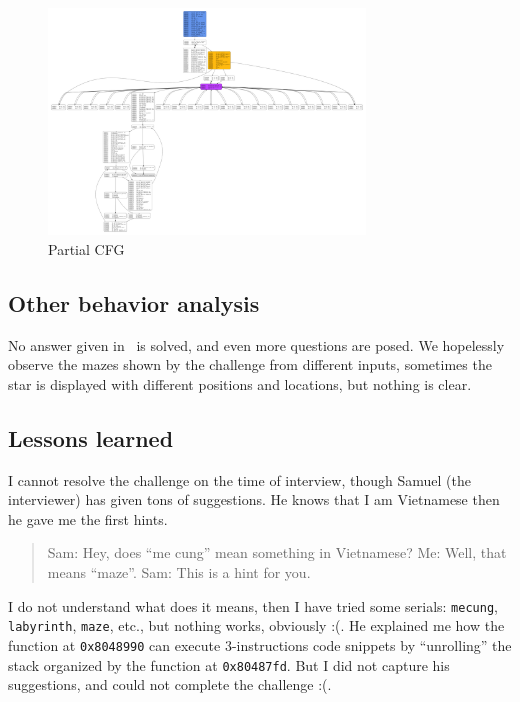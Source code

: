 \documentclass{easychair}
\begin{document}
\begin{figure}[h]
  \centering
  \includegraphics[width=0.75\textwidth,keepaspectratio]{mecung.pdf}
  \caption{Partial CFG}
  \label{fig:partial_cfg}
\end{figure}

\subsection{Other behavior analysis}
\label{sec:other_behavior_analysis}
No answer given in~ is solved, and even more questions are posed. We hopelessly observe the mazes shown by the challenge from different inputs, sometimes the star is displayed with different positions and locations, but nothing is clear.

\subsection{Lessons learned}
I cannot resolve the challenge on the time of interview, though Samuel (the interviewer) has given tons of suggestions. He knows that I am Vietnamese then he gave me the first hints.
\begin{quote}
  Sam: Hey, does ``me cung'' mean something in Vietnamese?\newline
  Me: Well, that means ``maze''.\newline
  Sam: This is a hint for you. 
\end{quote}
I do not understand what does it means, then I have tried some serials: \texttt{mecung}, \texttt{labyrinth}, \texttt{maze}, etc., but nothing works, obviously :(. He explained me how the function at \texttt{0x8048990} can execute $3$-instructions code snippets by ``unrolling''  the stack organized by the function at \texttt{0x80487fd}. But I did not capture his suggestions, and could not complete the challenge :(.

\printbibliography
\end{document}
